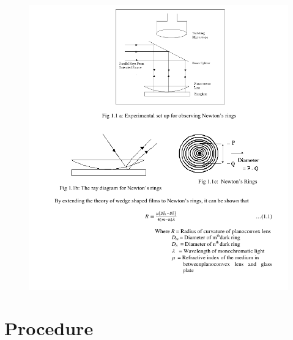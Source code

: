 \documentclass[11pt]{article}
\begin{document}
	\begin{figure}[H]
		\centering
		\includegraphics[scale=0.9]{theory.png}
		\label{it}
	\end{figure}
	\clearpage
	
	\section{Procedure}
	
\end{document}
